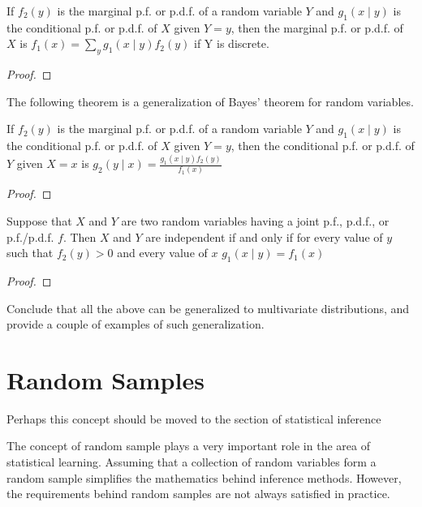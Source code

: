 \begin{proposition}
If $f_{2}\left(y\right)$ is the marginal p.f. or p.d.f. of a random variable $Y$ and $g_{1}\left(x\mid y\right)$ is the conditional p.f. or p.d.f. of $X$ given $Y=y$, then the marginal p.f. or p.d.f. of $X$ is $f_{1}\left(x\right)=\sum_{y}g_{\text{1}}\left(x\mid y\right)f_{2}\left(y\right)$
if Y is discrete.
\end{proposition}
\begin{proof}
\end{proof}

{\color{red} The following theorem is a generalization of Bayes' theorem for random variables.}

\begin{theorem}
If $f_{2}\left(y\right)$ is the marginal p.f. or p.d.f. of a random variable $Y$ and $g_{1}\left(x\mid y\right)$ is the conditional p.f. or p.d.f. of $X$ given $Y=y$, then the conditional p.f. or p.d.f. of $Y$ given $X=x$ is $g_{2}\left(y\mid x\right)=\frac{g_{1}\left(x\mid y\right)f_{2}\left(y\right)}{f_{1}\left(x\right)}$
\end{theorem}
\begin{proof}
\end{proof}

\begin{proposition}
Suppose that $X$ and $Y$ are two random variables having a joint p.f., p.d.f., or p.f./p.d.f. $f$. Then $X$ and $Y$ are independent if and only if for every value of $y$ such that $f_{2}\left(y\right)>0$ and every value of $x$ $g_{1}\left(x\mid y\right)=f_{1}\left(x\right)$
\end{proposition}
\begin{proof}
\end{proof}

{\color{red} Conclude that all the above can be generalized to multivariate distributions, and provide a couple of examples of such generalization.}


\section{Random Samples}

{\color{red} Perhaps this concept should be moved to the section of statistical inference}

The concept of random sample plays a very important role in the area of statistical learning. Assuming that a collection of random variables form a random sample simplifies the mathematics behind inference methods. However, the requirements behind random samples are not always satisfied in practice.

